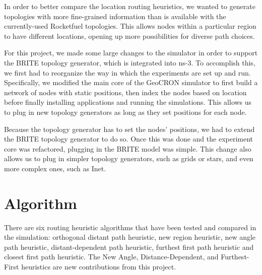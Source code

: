 \documentclass[conference]{IEEEtran}
\begin{document}
In order to better compare the location routing heuristics, we wanted to generate topologies with more fine-grained information than is available with the currently-used Rocketfuel topologies.
This allows nodes within a particular region to have different locations, opening up more possibilities for diverse path choices.

For this project, we made some large changes to the simulator in order to support the BRITE \cite{brite} topology generator, which is integrated into ns-3.
To accomplish this, we first had to reorganize the way in which the experiments are set up and run.
Specifically, we modified the main core of the GeoCRON simulator to first build a network of nodes with static positions, then index the nodes based on location before finally installing applications and running the simulations.
This allows us to plug in new topology generators as long as they set positions for each node.

Because the topology generator has to set the nodes' positions, we had to extend the BRITE topology generator to do so.
Once this was done and the experiment core was refactored, plugging in the BRITE model was simple.
This change also allows us to plug in simpler topology generators, such as grids or stars, and even more complex ones, such as Inet.



\section{Algorithm}
There are six routing heuristic algorithms that have been tested and compared in the simulation: orthogonal distant path heuristic, new region heuristic, new angle path heuristic, distant-dependent path heuristic, furthest first path heuristic and closest first path heuristic.
The New Angle, Distance-Dependent, and Furthest-First heuristics are new contributions from this project.

%
\end{document}
